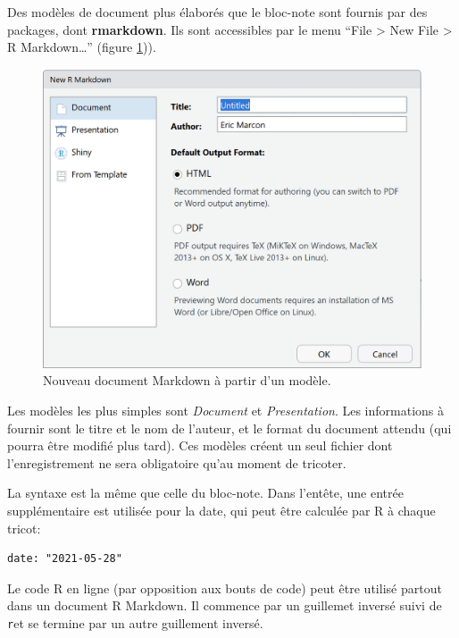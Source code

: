 \documentclass[
  12pt,
  french,
  a4paper,
  extrafontsizes,onecolumn,openright
  ]{memoir}
\begin{document}
Des modèles de document plus élaborés que le bloc-note sont fournis par des packages, dont \textbf{rmarkdown}.
Ils sont accessibles par le menu \enquote{File \textgreater{} New File \textgreater{} R Markdown\ldots{}} (figure \ref{fig:e-rmd1})).



\scriptsize

\begin{figure}

{\centering \includegraphics[width=0.8\linewidth]{images/e-rmd1} 

}

\caption{Nouveau document Markdown à partir d'un modèle.}\label{fig:e-rmd1}
\end{figure}

\normalsize

Les modèles les plus simples sont \emph{Document} et \emph{Presentation}.
Les informations à fournir sont le titre et le nom de l'auteur, et le format du document attendu (qui pourra être modifié plus tard).
Ces modèles créent un seul fichier dont l'enregistrement ne sera obligatoire qu'au moment de tricoter.

La syntaxe est la même que celle du bloc-note.
Dans l'entête, une entrée supplémentaire est utilisée pour la date, qui peut être calculée par R à chaque tricot:

\begin{verbatim}
date: "2021-05-28"
\end{verbatim}

Le code R en ligne (par opposition aux bouts de code) peut être utilisé partout dans un document R Markdown.
Il commence par un guillemet inversé suivi de \texttt{r}et se termine par un autre guillement inversé.
\end{document}
